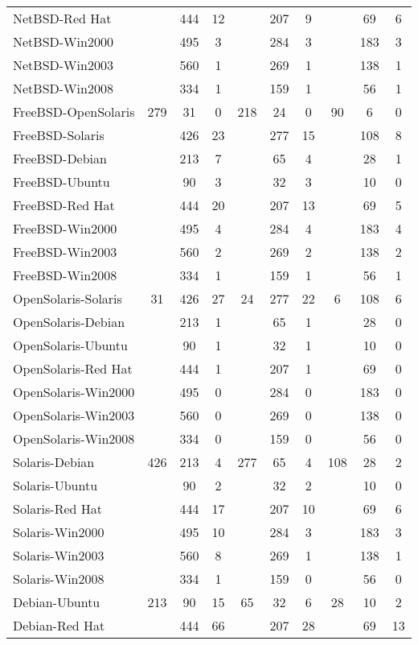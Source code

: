 \begin{table*}[!ht]
\begin{center}
{\begin{tabular}{|l|| c c c| c c c| c c c| }
NetBSD-Red Hat & & 444 & 12 & & 207 & 9 & & 69 & 6\\
NetBSD-Win2000 & & 495 & 3 & & 284 & 3 & & 183 & 3\\
NetBSD-Win2003 & & 560 & 1 & & 269 & 1 & & 138 & 1\\
NetBSD-Win2008 & & 334 & 1 & & 159 & 1 & & 56 & 1\\ \hline
FreeBSD-OpenSolaris & 279 & 31 & 0 & 218 & 24 & 0 & 90 & 6 & 0\\
FreeBSD-Solaris & & 426 & 23 & & 277 & 15 & & 108 & 8\\
FreeBSD-Debian & & 213 & 7 & & 65 & 4 & & 28 & 1\\
FreeBSD-Ubuntu & & 90 & 3 & & 32 & 3 & & 10 & 0\\
FreeBSD-Red Hat & & 444 & 20 & & 207 & 13 & & 69 & 5\\
FreeBSD-Win2000 & & 495 & 4 & & 284 & 4 & & 183 & 4\\
FreeBSD-Win2003 & & 560 & 2 & & 269 & 2 & & 138 & 2\\
FreeBSD-Win2008 & & 334 & 1 & & 159 & 1 & & 56 & 1\\ \hline
OpenSolaris-Solaris & 31 & 426 & 27 & 24 & 277 & 22 & 6 & 108 & 6\\
OpenSolaris-Debian & & 213 & 1 & & 65 & 1 & & 28 & 0\\
OpenSolaris-Ubuntu & & 90 & 1 & & 32 & 1 & & 10 & 0\\
OpenSolaris-Red Hat & & 444 & 1 & & 207 & 1 & & 69 & 0\\
OpenSolaris-Win2000 & & 495 & 0 & & 284 & 0 & & 183 & 0\\
OpenSolaris-Win2003 & & 560 & 0 & & 269 & 0 & & 138 & 0\\
OpenSolaris-Win2008 & & 334 & 0 & & 159 & 0 & & 56 & 0\\   \hline
Solaris-Debian & 426 & 213 & 4 & 277 & 65 & 4 & 108 & 28 & 2\\
Solaris-Ubuntu & & 90 & 2 & & 32 & 2 & & 10 & 0\\
Solaris-Red Hat & & 444 & 17 & & 207 & 10 & & 69 & 6\\
Solaris-Win2000 & & 495 & 10 & & 284 & 3 & & 183 & 3\\
Solaris-Win2003 & & 560 & 8 & & 269 & 1 & & 138 & 1\\
Solaris-Win2008 & & 334 & 1 & & 159 & 0 & & 56 & 0\\  \hline
Debian-Ubuntu & 213 & 90 & 15 & 65 & 32 & 6 & 28 & 10 & 2\\
Debian-Red Hat & & 444 & 66 & & 207 & 28 & & 69 & 13\\

\end{tabular}}
\end{center}
\end{table*}
